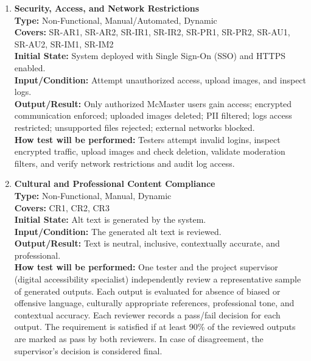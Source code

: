 \documentclass[12pt, titlepage]{article}
\begin{document}
\begin{enumerate}[label=NFR-ST \arabic*., wide=0pt, leftmargin=*]
  \item \textbf{Security, Access, and Network Restrictions} \\[2mm]
    \textbf{Type:} Non-Functional, Manual/Automated, Dynamic \\
    \textbf{Covers:} SR-AR1, SR-AR2, SR-IR1, SR-IR2, SR-PR1, SR-PR2,
    SR-AU1, SR-AU2, SR-IM1, SR-IM2 \\
    \textbf{Initial State:} System deployed with Single Sign-On (SSO) and HTTPS enabled. \\
    \textbf{Input/Condition:} Attempt unauthorized access, upload
    images, and inspect logs. \\
    \textbf{Output/Result:} Only authorized McMaster users gain
    access; encrypted communication enforced; uploaded images
    deleted; PII filtered; logs access restricted; unsupported files
    rejected; external networks blocked. \\[2mm]
    \textbf{How test will be performed:} Testers attempt invalid
    logins, inspect encrypted traffic, upload images and check
    deletion, validate moderation filters, and verify network
    restrictions and audit log access.

    \item \textbf{Cultural and Professional Content Compliance} \\[2mm]
    \textbf{Type:} Non-Functional, Manual, Dynamic \\
    \textbf{Covers:} CR1, CR2, CR3 \\
    \textbf{Initial State:} Alt text is generated by the system. \\
    \textbf{Input/Condition:} The generated alt text is reviewed. \\
    \textbf{Output/Result:} Text is neutral, inclusive, contextually
    accurate, and professional. \\[2mm]
    \textbf{How test will be performed:} One tester and the project supervisor
    (digital accessibility specialist) independently review a representative
    sample of generated outputs. Each output is evaluated for absence of biased
    or offensive language, culturally appropriate references, professional tone,
    and contextual accuracy. Each reviewer records a pass/fail decision for each
    output. The requirement is satisfied if at least 90\% of the reviewed outputs
    are marked as pass by both reviewers. In case of disagreement, the supervisor's
    decision is considered final.
    

\end{enumerate}
\end{document}
